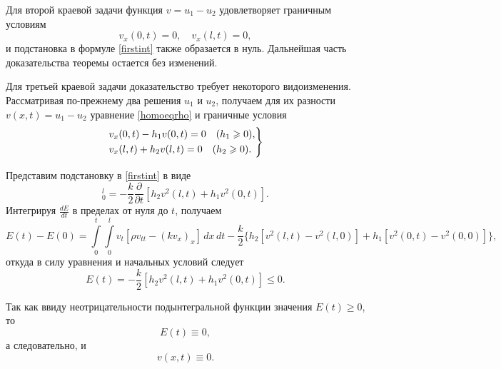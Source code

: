 Для второй краевой задачи функция $v = u_1 - u_2$ удовлетворяет граничным условиям 
\begin{equation}
	v_x(0, t) = 0, \quad v_x(l, t) = 0,
\end{equation}
и подстановка в формуле \eqref{firstint} также образается в нуль. Дальнейшая часть доказательства теоремы остается без изменений.

Для третьей краевой задачи доказательство требует некоторого видоизменения. Рассматривая по-прежнему два решения $u_1$ и $u_2$, получаем для их разности $v(x, t) = u_1 - u_2$ уравнение \eqref{homoeqrho} и граничные условия 
\begin{equation}
	\begin{rcases}
		v_x(0, t) - h_1 v(0, t) = 0 \quad (h_1 \geqslant 0), \\
		v_x(l, t) + h_2 v(l, t) = 0 \quad (h_2 \geqslant 0).
	\end{rcases}
\end{equation}

Представим подстановку в \eqref{firstint} в виде 
\begin{equation}
	[k v_x v_t]_{0}^{l} = - \frac{k}{2} \frac{\partial}{\partial t}[h_2 v^2(l, t) + h_1 v^2(0, t)].
\end{equation}
Интегрируя $\frac{dE}{dt}$ в пределах от нуля до $t$, получаем
\begin{equation}
	E(t) - E(0) = \int \limits_{0}^{t} \int \limits_{0}^{l} v_t[\rho v_{tt} - (k v_x)_x] \, dx \, dt - \frac{k}{2} \{h_2[v^2(l, t) - v^2(l, 0)] + h_1[v^2(0, t) - v^2(0, 0)]\},
\end{equation}
откуда в силу уравнения и начальных условий следует 
\begin{equation}
	E(t) = -\frac{k}{2} [h_2 v^2(l, t) + h_1 v^2(0, t)] \leqslant 0.
\end{equation}

Так как ввиду неотрицательности подынтегральной функции значения $E(t) \geqslant 0$, то 
\begin{equation}
	E(t) \equiv 0,
\end{equation}
а следовательно, и
\begin{equation}
	v(x, t) \equiv 0.
\end{equation}

